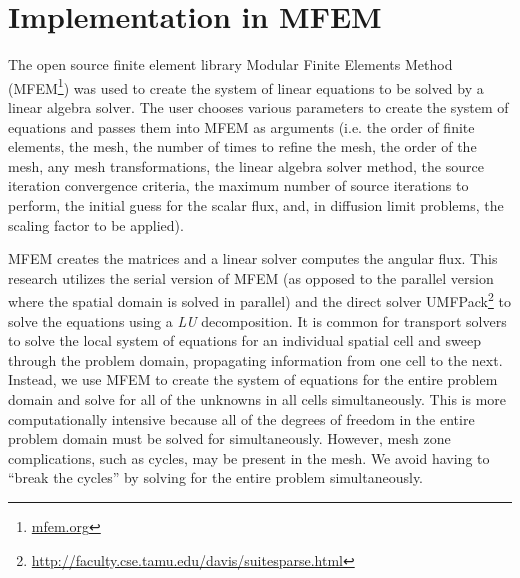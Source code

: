\documentclass{article}
\begin{document}
\section{Implementation in MFEM}
The open source finite element library Modular Finite Elements Method (MFEM\footnote{\url{mfem.org}}) \cite{MFEM_Web} was used to create the system of linear equations to be solved by a linear algebra solver. The user chooses various parameters to create the system of equations and passes them into MFEM as arguments (i.e. the order of finite elements, the mesh, the number of times to refine the mesh, the order of the mesh, any mesh transformations, the linear algebra solver method, the source iteration convergence criteria, the maximum number of source iterations to perform, the initial guess for the scalar flux, and, in diffusion limit problems, the scaling factor to be applied).

MFEM creates the matrices and a linear solver computes the angular flux. This research utilizes the serial version of MFEM (as opposed to the parallel version where the spatial domain is solved in parallel) and the direct solver UMFPack\footnote{\url{http://faculty.cse.tamu.edu/davis/suitesparse.html}} \cite{SuiteSparse,DavisUMFPack} to solve the equations using a \emph{LU} decomposition. It is common for transport solvers to solve the local system of equations for an individual spatial cell and sweep through the problem domain, propagating information from one cell to the next. Instead, we use MFEM to create the system of equations for the entire problem domain and solve for all of the unknowns in all cells simultaneously. This is more computationally intensive because all of the degrees of freedom in the entire problem domain must be solved for simultaneously. However, mesh zone complications, such as cycles, may be present in the mesh. We avoid having to ``break the cycles'' by solving for the entire problem simultaneously.

\end{document}
